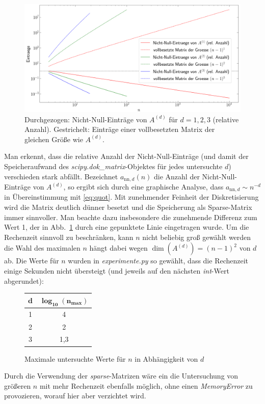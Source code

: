 \documentclass[smallheadings]{scrartcl}
\numberwithin{equation}{section}
\begin{document}
\begin{figure}[H]
\includegraphics[width=\textwidth]{Bilder/nn_eintraege}

\caption{Durchgezogen: Nicht-Null-Einträge von $A^{(d)}$ für $d=1,2,3$ (relative Anzahl). Gestrichelt: Einträge einer vollbesetzten Matrix der gleichen Größe wie $A^{(d)}$.}
\label{im:nn_eintr}
\end{figure}



Man erkennt, dass die relative Anzahl der Nicht-Null-Einträge (und damit der Speicheraufwand des \textit{scipy.dok\_matrix}-Objektes für jedes untersuchte $d$) verschieden stark abfällt. Bezeichnet $a_{\text{nn},d}(n)$ die Anzahl der 
Nicht-Null-Einträge von $A^{(d)}$, so ergibt sich durch eine graphische Analyse, dass $a_{\text{nn},d}\sim n^{-d}$ in Übereinstimmung mit \eqref{eq:quot}. Mit zunehmender Feinheit der Diskretisierung wird die Matrix deutlich dünner besetzt und die Speicherung als Sparse-Matrix immer sinnvoller. Man beachte dazu insbesondere die zunehmende Differenz zum Wert 1, der in Abb.~\ref{im:nn_eintr} durch eine gepunktete Linie eingetragen wurde. 
Um die Rechenzeit sinnvoll zu beschränken, kann $n$ nicht beliebig groß gewählt werden die Wahl des maximalen $n$ hängt dabei wegen $\dim(A^{(d)})=(n-1)^2$ von $d$ ab. Die Werte für $n$ wurden in \textit{experimente.py} so gewählt, dass die Rechenzeit einige Sekunden nicht übersteigt (und jeweils auf den nächsten \textit{int}-Wert abgerundet):
\begin{figure}[H]
\centering
\begin{tabular}{|c|c|}
\hline
$\boldsymbol{d}$ & $\boldsymbol{\log_{10}(n_{max})}$\\
\hline
1 & 4\\
\hline
2 & 2\\
\hline
3 & 1,3\\
\hline

\end{tabular}
\caption{Maximale untersuchte Werte für $n$ in Abhängigkeit von $d$}
\end{figure}
Durch die Verwendung der \textit{sparse}-Matrizen wäre ein die Untersuchung von größeren $n$ mit mehr Rechenzeit ebenfalls möglich, ohne einen \textit{MemoryError} zu provozieren, worauf hier aber verzichtet wird.
\end{document}
